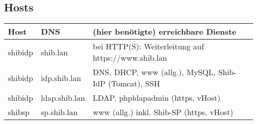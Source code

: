 \subsection{Hosts}
\begin{center}
	\begin{tabular}{| l | l | l | p{7cm} |}
		\hline
		Host & DNS & (hier benötigte) erreichbare Dienste \\ \hline\hline
		 shibidp & shib.lan & bei HTTP(S): Weiterleitung auf
		https://www.shib.lan \\ \hline
		shibidp & idp.shib.lan & DNS, DHCP, www
		(allg.), MySQL, Shib-IdP (Tomcat), SSH
		\\
		\hline
		shibidp & ldap.shib.lan & LDAP, phpldapadmin (https,
		vHost)
		\\
		\hline  shibsp & sp.shib.lan & www (allg.) inkl. Shib-SP (https,
		vHost)
		\\
		\hline

	\end{tabular}
\end{center}
